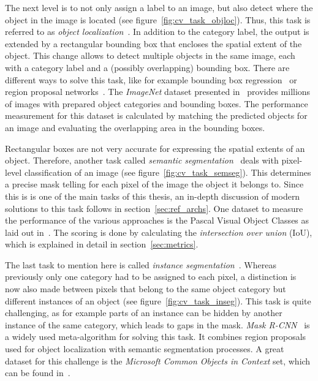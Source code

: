 The next level is to not only assign a label to an image, but also detect where the object in the image is located (see figure~\ref{fig:cv_task_objloc}). Thus, this task is referred to as \emph{object localization}~\cite{rcnn14}. In addition to the category label, the output is extended by a rectangular bounding box that encloses the spatial extent of the object. This change allows to detect multiple objects in the same image, each with a category label and a (possibly overlapping) bounding box. There are different ways to solve this task, like for example bounding box regression~\cite{obj_detection13} or region proposal networks~\cite{ff-rcnn14}. The \emph{ImageNet} dataset presented in~\cite{imgnet09} provides millions of images with prepared object categories and bounding boxes. The performance measurement for this dataset is calculated by matching the predicted objects for an image and evaluating the overlapping area in the bounding boxes.

Rectangular boxes are not very accurate for expressing the spatial extents of an object. Therefore, another task called \emph{semantic segmentation}~\cite{weakseg15} deals with pixel-level classification of an image (see figure~\ref{fig:cv_task_semseg}). This determines a precise mask telling for each pixel of the image the object it belongs to. Since this is is one of the main tasks of this thesis, an in-depth discussion of modern solutions to this task follows in section~\ref{sec:ref_archs}. One dataset to measure the performance of the various approaches is the Pascal Visual Object Classes as laid out in~\cite{pascal_voc15}. The scoring is done by calculating the \emph{intersection over union} (IoU), which is explained in detail in section~\ref{sec:metrics}.

The last task to mention here is called \emph{instance segmentation}~\cite{mask-rcnn14}. Whereas previously only one category had to be assigned to each pixel, a distinction is now also made between pixels that belong to the same object category but different instances of an object (see figure~\ref{fig:cv_task_inseg}). This task is quite challenging, as for example parts of an instance can be hidden by another instance of the same category, which leads to gaps in the mask. \emph{Mask R-CNN}~\cite{mask-rcnn14} is a widely used meta-algorithm for solving this task. It combines region proposals used for object localization with semantic segmentation processes. A great dataset for this challenge is the \emph{Microsoft Common Objects in Context} set, which can be found in~\cite{coco15}.

